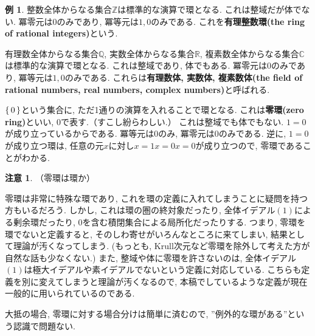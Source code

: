 \documentclass[a4paper, twoside]{bxjsarticle}
\newcommand{\zah}{\mathbb{Z}}
\newcommand{\quo}{\mathbb{Q}}
\newcommand{\rea}{\mathbb{R}}
\newcommand{\com}{\mathbb{C}}
\newcommand{\tb}{\textbf}
\theoremstyle{definition}
\newtheorem{exm}[thm]{例}
\newtheorem{rem}[thm]{注意}
\begin{document}
        \begin{exm}
            整数全体からなる集合$\zah$は標準的な演算で環となる. これは整域だが体でない. 冪零元は$0$のみであり, 冪等元は$1, 0$のみである. これを\tb{有理整数環(the ring of rational integers)}という.

            有理数全体からなる集合$\quo$, 実数全体からなる集合$\rea$, 複素数全体からなる集合$\com$は標準的な演算で環となる. これは整域であり, 体でもある. 冪零元は$0$のみであり, 冪等元は$1, 0$のみである. これらは\tb{有理数体, 実数体, 複素数体(the field of rational numbers, real numbers, complex numbers)}と呼ばれる.

            $\set{0}$という集合に, ただ1通りの演算を入れることで環となる. これは\tb{零環(zero ring)}といい, $0$で表す.（すこし紛らわしい.） これは整域でも体でもない. $1=0$が成り立っているからである. 冪等元は$0$のみ, 冪零元は$0$のみである. 逆に, $1=0$が成り立つ環は, 任意の元$x$に対し$x=1x=0x=0$が成り立つので, 零環であることがわかる. 
        \end{exm}
        \begin{rem}（零環は環か）

            零環は非常に特殊な環であり, これを環の定義に入れてしまうことに疑問を持つ方もいるだろう. しかし, これは環の圏の終対象だったり, 全体イデアル$(1)$による剰余環だったり, $0$を含む積閉集合による局所化だったりする. つまり, 零環を環でないと定義すると, そのしわ寄せがいろんなところに来てしまい, 結果として理論が汚くなってしまう. (もっとも, Krull次元など零環を除外して考えた方が自然な話も少なくない.)
            また, 整域や体に零環を許さないのは, 全体イデアル$(1)$は極大イデアルや素イデアルでないという定義に対応している. こちらも定義を別に変えてしまうと理論が汚くなるので, 本稿でしているような定義が現在一般的に用いられているのである.

            大抵の場合, 零環に対する場合分けは簡単に済むので, ”例外的な環がある”という認識で問題ない.
        \end{rem}
\end{document}
